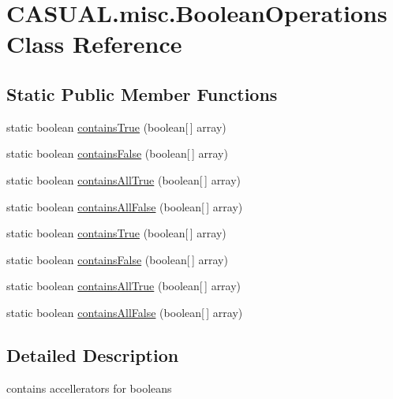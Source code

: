 \hypertarget{class_c_a_s_u_a_l_1_1misc_1_1_boolean_operations}{\section{C\-A\-S\-U\-A\-L.\-misc.\-Boolean\-Operations Class Reference}
\label{class_c_a_s_u_a_l_1_1misc_1_1_boolean_operations}
}
\subsection*{Static Public Member Functions}
\begin{DoxyCompactItemize}
\item 
static boolean \hyperlink{class_c_a_s_u_a_l_1_1misc_1_1_boolean_operations_abbaa982b83fe042c5bc99732b6a3895b}{contains\-True} (boolean\mbox{[}$\,$\mbox{]} array)
\item 
static boolean \hyperlink{class_c_a_s_u_a_l_1_1misc_1_1_boolean_operations_a3430431c1adfe2e54f6f79ad80727278}{contains\-False} (boolean\mbox{[}$\,$\mbox{]} array)
\item 
static boolean \hyperlink{class_c_a_s_u_a_l_1_1misc_1_1_boolean_operations_a9d9505748bc5ea948e2bbe2575dc76ec}{contains\-All\-True} (boolean\mbox{[}$\,$\mbox{]} array)
\item 
static boolean \hyperlink{class_c_a_s_u_a_l_1_1misc_1_1_boolean_operations_a0e8040e7c409325c27d97d85a26967e5}{contains\-All\-False} (boolean\mbox{[}$\,$\mbox{]} array)
\item 
static boolean \hyperlink{class_c_a_s_u_a_l_1_1misc_1_1_boolean_operations_abbaa982b83fe042c5bc99732b6a3895b}{contains\-True} (boolean\mbox{[}$\,$\mbox{]} array)
\item 
static boolean \hyperlink{class_c_a_s_u_a_l_1_1misc_1_1_boolean_operations_a3430431c1adfe2e54f6f79ad80727278}{contains\-False} (boolean\mbox{[}$\,$\mbox{]} array)
\item 
static boolean \hyperlink{class_c_a_s_u_a_l_1_1misc_1_1_boolean_operations_a9d9505748bc5ea948e2bbe2575dc76ec}{contains\-All\-True} (boolean\mbox{[}$\,$\mbox{]} array)
\item 
static boolean \hyperlink{class_c_a_s_u_a_l_1_1misc_1_1_boolean_operations_a0e8040e7c409325c27d97d85a26967e5}{contains\-All\-False} (boolean\mbox{[}$\,$\mbox{]} array)
\end{DoxyCompactItemize}


\subsection{Detailed Description}
contains accellerators for booleans

